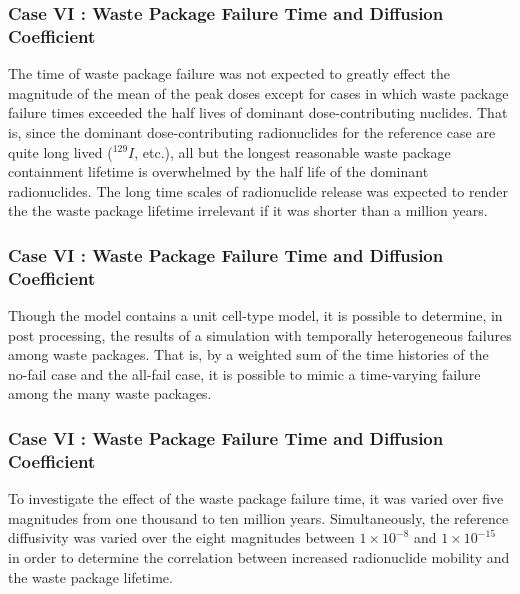 
\begin{frame}[c]
  \frametitle{Case VI : Waste Package Failure Time and Diffusion Coefficient}

The time of waste package failure was not expected to greatly effect the 
magnitude of the mean of the peak doses except for cases in which waste package failure times 
exceeded the half lives of dominant dose-contributing nuclides. 
That is, since the dominant dose-contributing 
radionuclides for the reference case are quite long lived ($^{129}I$, etc.), 
all but the longest reasonable waste package containment lifetime is overwhelmed by 
the half life of the dominant radionuclides. The long time scales of 
radionuclide release was expected to render the the waste package lifetime 
irrelevant if it was shorter than a million years. 
\end{frame}

\begin{frame}[c]
  \frametitle{Case VI : Waste Package Failure Time and Diffusion Coefficient}
Though the model contains a unit cell-type model, it is possible to determine, 
in post processing, the results of a simulation with temporally heterogeneous 
failures among waste packages. That is, by a weighted sum of the time histories 
of the no-fail case and the all-fail case, it is possible to mimic a 
time-varying failure among the many waste packages. 

\end{frame}

\begin{frame}[c]
  \frametitle{Case VI : Waste Package Failure Time and Diffusion Coefficient}

To investigate the effect of the waste package failure time, it was varied over 
five magnitudes from one thousand to ten million years. Simultaneously, the reference 
diffusivity was varied over the eight magnitudes between $1\times10^{-8}$ and 
$1\times10^{-15}$ in order to determine the correlation between increased 
radionuclide mobility and the waste package lifetime. 

\end{frame}

